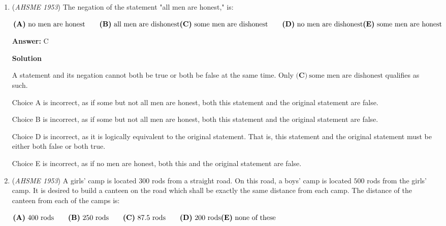 \begin{enumerate}
 



\textbf{Solution 2}

By the change-of-base formula, $\log_a b \cdot \log_b a = \frac{\log b}{\log a} \cdot \frac{\log a}{\log b} = \boxed{\textbf{(A) }1}$.

 


	\item (\textit{AHSME 1953}) The negation of the statement "all men are honest," is: 


 $\textbf{(A)}\ \text{no men are honest} \qquad \textbf{(B)}\ \text{all men are dishonest} \\  \textbf{(C)}\ \text{some men are dishonest}\qquad \textbf{(D)}\ \text{no men are dishonest}\\ \textbf{(E)}\ \text{some men are honest}$

 \textbf{Answer: }C



\textbf{Solution}

A statement and its negation cannot both be true or both be false at the same time.  Only $\boxed{\textbf{(C)}\ \text{some men are dishonest}}$ qualifies as such.

 Choice A is incorrect, as if some but not all men are honest, both this statement and the original statement are false.

 Choice B is incorrect, as if some but not all men are honest, both this statement and the original statement are false.

 Choice D is incorrect, as it is logically equivalent to the original statement.  That is, this statement and the original statement must be either both false or both true.

 Choice E is incorrect, as if no men are honest, both this and the original statement are false.

 


	\item (\textit{AHSME 1953}) A girls' camp is located $300$ rods from a straight road. On this road, a boys' camp is located $500$ rods from the girls' camp. 
It is desired to build a canteen on the road which shall be exactly the same distance from each camp. 
The distance of the canteen from each of the camps is: 


 $\textbf{(A)}\ 400\text{ rods} \qquad \textbf{(B)}\ 250\text{ rods} \qquad \textbf{(C)}\ 87.5\text{ rods} \qquad \textbf{(D)}\ 200\text{ rods}\\ \textbf{(E)}\ \text{none of these}$


\end{enumerate}
